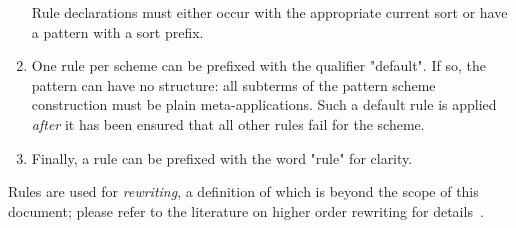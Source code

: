 \documentclass[11pt]{article} %
\begin{document}
\begin{manual}
\begin{enumerate}
    Rule declarations must either occur with the appropriate current sort or have a pattern with a
    sort prefix.

  \item One rule per scheme can be prefixed with the qualifier "default". If so, the pattern can
    have no structure: all subterms of the pattern scheme construction must be plain
    meta-applications. Such a default rule is applied \emph{after} it has been ensured that all
    other rules fail for the scheme.

  \item Finally, a rule can be prefixed with the word "rule" for clarity.

  \end{enumerate}
  Rules are used for \emph{rewriting}, a definition of which is beyond the scope of this document;
  please refer to the literature on higher order rewriting for details~\cite{Jouannaud:klop2005,Klop+:tcs1993}.
\end{manual}
\end{document}
